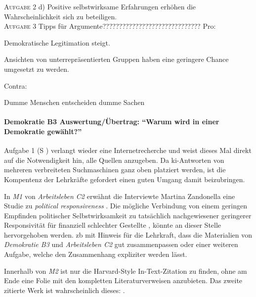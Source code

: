 \textsc{Aufgabe 2} d) \quad
Positive selbstwirksame Erfahrungen erhöhen die Wahrscheinlichkeit sich zu beteiligen. 
\\

\textsc{Aufgabe 3} \quad
Tipps für Argumente??????????????????????????????
Pro:
\begin{myitemize}
    \item Demokratische Legitimation steigt. 
    \item Ansichten von unterrepräsentierten Gruppen haben eine geringere Chance umgesetzt zu werden. 
    \item 
\end{myitemize}
Contra:
\begin{myitemize}
    \item Dumme Menschen entscheiden dumme Sachen
    \item 
\end{myitemize}

\paragraph{Demokratie B3 Auswertung/Übertrag: \enquote{Warum wird in einer Demokratie gewählt?}} 
Aufgabe 1 (\gls{S} \pageref{DEMOKRATIE-B3}) verlangt wieder eine Internetrecherche und weist dieses Mal direkt auf die Notwendigkeit hin, alle Quellen anzugeben.  Da \gls{ki}-Antworten von mehreren verbreiteten Suchmaschinen ganz oben platziert werden, ist die Kompentenz der Lehrkräfte gefordert einen guten Umgang damit beizubringen. 

In \emph{M1} von \emph{Arbeitsleben C2} erwähnt die Interviewte Martina Zandonella eine Studie zu \emph{political responsiveness} \autocite[]{Elsasser.2017}. Die mögliche Verbindung von einem geringen Empfinden politischer Selbstwirksamkeit zu tatsächlich nachgewiesener geringerer Responsivität für finanziell schlechter Gestellte \autocite{Elsasser.2017}, könnte an dieser Stelle hervorgehoben werden. \Gls{zb} mit Hinweis für die Lehrkraft, dass die Materialien von \emph{Demokratie B3} und \emph{Arbeitsleben C2} gut zusammenpassen oder einer weiteren Aufgabe, welche den Zusammenhang expliziter werden lässt. 

Innerhalb von \emph{M2} ist nur die Harvard-Style In-Text-Zitation zu finden, ohne am Ende eine Folie mit den kompletten Literaturverweisen anzubieten. Das zweite zitierte Werk ist wahrscheinlich dieses: \textcite[]{Probst.2022}. 



